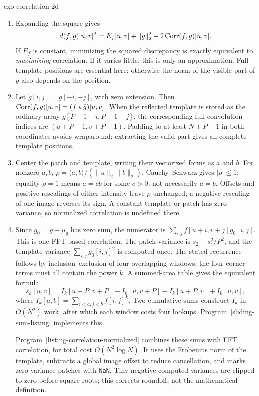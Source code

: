 \begin{correction}{exo-correlation-2d}
\begin{enumerate}
\item Expanding the square gives
\[
 d(f,g)[u,v]^2=E_f[u,v]+\|g\|_2^2-2\operatorname{Corr}(f,g)[u,v].
\]
If $E_f$ is constant, minimizing the squared discrepancy is exactly equivalent
to \emph{maximizing} correlation. If it varies little, this is only an approximation.
Full-template positions are essential here: otherwise the norm of the
visible part of $g$ also depends on the position.
\item Let $\check g[i,j]=g[-i,-j]$, with zero extension. Then
$\operatorname{Corr}(f,g)[u,v]=(f\star\check g)[u,v]$.
When the reflected template is stored as the ordinary array
$g[P-1-i,P-1-j]$, the corresponding full-convolution indices are
$(u+P-1,v+P-1)$. Padding to at least $N+P-1$ in both coordinates avoids
wraparound; extracting the valid part gives all complete-template positions.
\item Center the patch and template, writing their vectorized forms as
$a$ and $b$. For nonzero $a,b$,
$\rho=\langle a,b\rangle/(\|a\|_2\|b\|_2)$.
Cauchy--Schwarz gives $|\rho|\leq1$; equality $\rho=1$ means
$a=cb$ for some $c>0$, not necessarily $a=b$.
Offsets and positive rescalings of either intensity leave $\rho$ unchanged;
a negative rescaling of one image reverses its sign. A constant template
or patch has zero variance, so normalized correlation is undefined there.
\item Since $g_0=g-\mu_g$ has zero sum, the numerator is
$\sum_{i,j}f[u+i,v+j]g_0[i,j]$. This is one FFT-based correlation.
The patch variance is $s_2-s_1^2/P^2$, and the template variance
$\sum_{i,j}g_0[i,j]^2$ is computed once.
The stated recurrence follows by inclusion--exclusion of four overlapping
windows; the four corner terms must all contain the power $k$.
A summed-area table gives the equivalent formula
\[
 s_k[u,v]=I_k[u+P,v+P]-I_k[u,v+P]-I_k[u+P,v]+I_k[u,v],
\]
where $I_k[a,b]=\sum_{i<a,j<b}f[i,j]^k$.
Two cumulative sums construct $I_k$ in $O(N^2)$ work, after which each
window costs four lookups. Program~\ref{sliding-sum-listing} implements this.
\begin{listing}[H]
\caption{Sliding sums from a summed-area table.}
\label{sliding-sum-listing}
\end{listing}
Program~\ref{listing-correlation-normalized} combines these sums with FFT
correlation, for total cost $O(N^2\log N)$. It uses the Frobenius norm of
the template, subtracts a global image offset to reduce cancellation, and
marks zero-variance patches with \texttt{NaN}. Tiny negative computed
variances are clipped to zero before square roots; this corrects roundoff,
not the mathematical definition.
\begin{listing}[H]
\caption{Normalized correlation at complete-template positions.}
\label{listing-correlation-normalized}
\end{listing}
\end{enumerate}
\end{correction}

